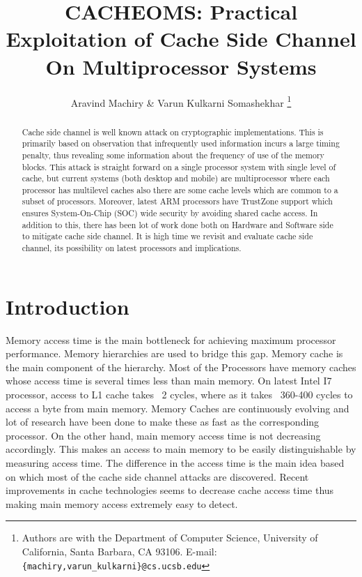 \documentclass[twocolumn]{IEEEtran}
\begin{document}
\title{CACHEOMS: Practical Exploitation of \textbf{Cache} Side Channel \textbf{O}n \textbf{M}ultiprocessor \textbf{S}ystems}


\author{Aravind Machiry \& Varun Kulkarni Somashekhar
\thanks{Authors are with the
Department of Computer Science,
University of California, Santa Barbara, CA 93106.
E-mail: \texttt{\{machiry,varun\_kulkarni\}@cs.ucsb.edu}}
}

\maketitle

\begin{abstract}
Cache side channel is well known attack on cryptographic implementations\cite{bernstein2005cache}\cite{aciccmez2006trace}\cite{banescu2011cache}. This is primarily based on observation that infrequently used information incurs a large timing penalty, thus revealing some information about the frequency of use of the memory blocks. This attack is straight forward on a single processor system with single level of cache, but current systems (both desktop and mobile) are multiprocessor where each processor has multilevel caches also there are some cache levels which are common to a subset of processors. Moreover, latest ARM processors have TrustZone support\cite{frenzel2010arm} which ensures System-On-Chip (SOC) wide security by avoiding shared cache access. In addition to this, there has been lot of work done both on Hardware and Software side to mitigate cache side channel\cite{180212}\cite{wang2007new}. It is high time we revisit and evaluate cache side channel, its possibility on latest processors and implications\cite{184415}.\\
\end{abstract}

\section {Introduction}
Memory access time is the main bottleneck for achieving maximum processor performance. Memory hierarchies are used to bridge this gap. Memory cache is the main component of the hierarchy. Most of the Processors have memory caches whose access time is several times less than main memory. On latest Intel I7 processor, access to L1 cache takes ~2 cycles, where as it takes ~360-400 cycles to access a byte from main memory. Memory Caches are continuously evolving and lot of research have been done to make these as fast as the corresponding processor. On the other hand, main memory access time is not decreasing accordingly. This makes an access to main memory to be easily distinguishable by measuring access time. The difference in the access time is the main idea based on which most of the cache side channel attacks are discovered. Recent improvements in cache technologies seems to decrease cache access time thus making main memory access extremely easy to detect. 
\end{document}
